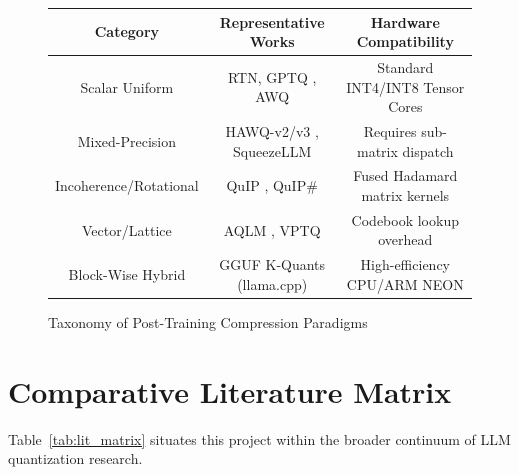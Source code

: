 \documentclass[12pt,a4paper,oneside]{report}
\begin{document}
\begin{figure}[h!]
\centering
\begin{tabular}{|c|c|c|}
\hline
\textbf{Category} & \textbf{Representative Works} & \textbf{Hardware Compatibility} \\
\hline
Scalar Uniform & RTN, GPTQ \cite{frantar2023gptq}, AWQ \cite{lin2024awq} & Standard INT4/INT8 Tensor Cores \\
Mixed-Precision & HAWQ-v2/v3 \cite{dong2020hawq}, SqueezeLLM \cite{kim2023squeezellm} & Requires sub-matrix dispatch \\
Incoherence/Rotational & QuIP \cite{chee2023quip}, QuIP\# \cite{tseng2024quip} & Fused Hadamard matrix kernels \\
Vector/Lattice & AQLM \cite{egorov2024extreme}, VPTQ \cite{guo2024vptq} & Codebook lookup overhead \\
Block-Wise Hybrid & GGUF K-Quants (llama.cpp) & High-efficiency CPU/ARM NEON \\
\hline
\end{tabular}
\caption{Taxonomy of Post-Training Compression Paradigms}
\label{fig:quant_taxonomy}
\end{figure}

\section{Comparative Literature Matrix}
Table~\ref{tab:lit_matrix} situates this project within the broader continuum of LLM quantization research.
\end{document}
